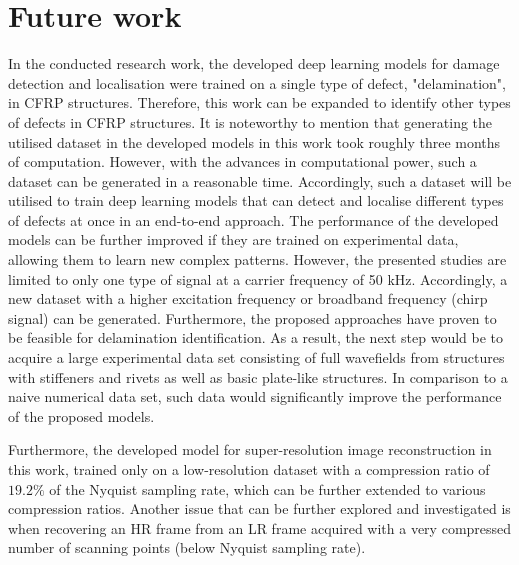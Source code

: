 \section{Future work}
\label{sec62}

In the conducted research work, the developed deep learning models for damage detection and localisation were trained on a single type of defect, "delamination", in CFRP structures.
Therefore, this work can be expanded to identify other types of defects in CFRP structures.
It is noteworthy to mention that generating the utilised dataset in the developed models in this work took roughly three months of computation.
However, with the advances in computational power, such a dataset can be generated in a reasonable time.
Accordingly, such a dataset will be utilised to train deep learning models that can detect and localise different types of defects at once in an end-to-end approach.
The performance of the developed models can be further improved if they are trained on experimental data, allowing them to learn new complex patterns.
However, the presented studies are limited to only one type of signal at a carrier frequency of 50 kHz.
Accordingly, a new dataset with a higher excitation frequency or broadband frequency (chirp signal) can be generated.
Furthermore, the proposed approaches have proven to be feasible for delamination identification.
As a result, the next step would be to acquire a large experimental data set consisting of full wavefields from structures with stiffeners and rivets as well as basic plate-like structures.
In comparison to a naive numerical data set, such data would significantly improve the performance of the proposed models.

Furthermore, the developed model for super-resolution image reconstruction in this work, trained only on a low-resolution dataset with a compression ratio of $19.2\%$ of the Nyquist sampling rate, which can be further extended to various compression ratios.
Another issue that can be further explored and investigated is when recovering an HR frame from an LR frame acquired with a very compressed number of scanning points (below Nyquist sampling rate). 





